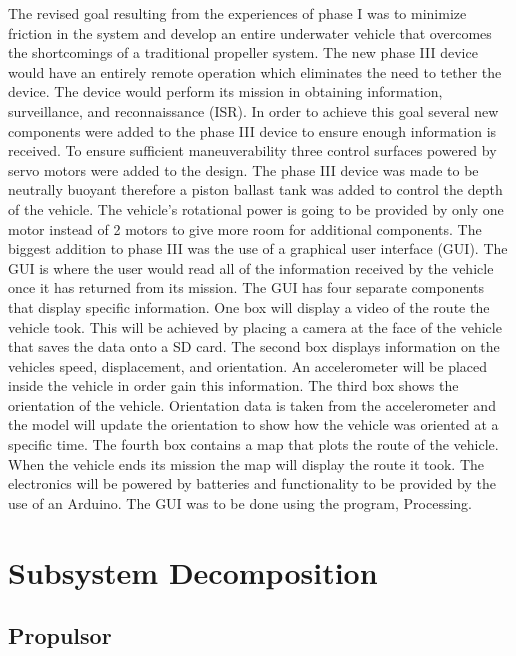 \documentclass{report}
\begin{document}
The revised goal resulting from the experiences of phase I was to minimize friction in the system and develop an entire underwater vehicle that overcomes the shortcomings of a traditional propeller system. The new phase III device would have an entirely remote operation which eliminates the need to tether the device. The device would perform its mission in obtaining information, surveillance, and reconnaissance (ISR). In order to achieve this goal several new components were added to the phase III device to ensure enough information is received. To ensure sufficient maneuverability three control surfaces powered by servo motors were added to the design. The phase III device was made to be neutrally buoyant therefore a piston ballast tank was added to control the depth of the vehicle. The vehicle’s rotational power is going to be provided by only one motor instead of 2 motors to give more room for additional components. The biggest addition to phase III was the use of a graphical user interface (GUI). The GUI is where the user would read all of the information received by the vehicle once it has returned from its mission. The GUI has four separate components that display specific information. One box will display a video of the route the vehicle took. This will be achieved by placing a camera at the face of the vehicle that saves the data onto a SD card. The second box displays information on the vehicles speed, displacement, and orientation. An accelerometer will be placed inside the vehicle in order gain this information. The third box shows the orientation of the vehicle. Orientation data is taken from the accelerometer and the model will update the orientation to show how the vehicle was oriented at a specific time. The fourth box contains a map that plots the route of the vehicle. When the vehicle ends its mission the map will display the route it took. The electronics will be powered by batteries and functionality to be provided by the use of an Arduino. The GUI was to be done using the program, Processing.\par
\section{Subsystem Decomposition}
\subsection{Propulsor}
\end{document}
